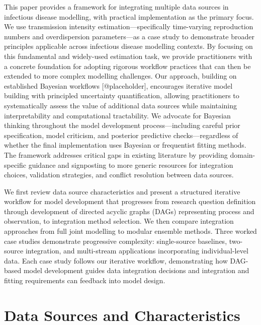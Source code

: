\documentclass{article}
\begin{document}
This paper provides a framework for integrating multiple data sources in infectious disease modelling, with practical implementation as the primary focus.
We use transmission intensity estimation—specifically time-varying reproduction numbers and overdispersion parameters—as a case study to demonstrate broader principles applicable across infectious disease modelling contexts.
By focusing on this fundamental and widely-used estimation task, we provide practitioners with a concrete foundation for adopting rigorous workflow practices that can then be extended to more complex modelling challenges.
Our approach, building on established Bayesian workflows [@placeholder], encourages iterative model building with principled uncertainty quantification, allowing practitioners to systematically assess the value of additional data sources while maintaining interpretability and computational tractability.
We advocate for Bayesian thinking throughout the model development process—including careful prior specification, model criticism, and posterior predictive checks—regardless of whether the final implementation uses Bayesian or frequentist fitting methods.
The framework addresses critical gaps in existing literature by providing domain-specific guidance and signposting to more generic resources for integration choices, validation strategies, and conflict resolution between data sources.

We first review data source characteristics and present a structured iterative workflow for model development that progresses from research question definition through development of directed acyclic graphs (DAGs) representing process and observation, to integration method selection.
We then compare integration approaches from full joint modelling to modular ensemble methods.
Three worked case studies demonstrate progressive complexity: single-source baselines, two-source integration, and multi-stream applications incorporating individual-level data.
Each case study follows our iterative workflow, demonstrating how DAG-based model development guides data integration decisions and integration and fitting requirements can feedback into model design.

\section{Data Sources and Characteristics} \label{sec:datareview}
\end{document}

